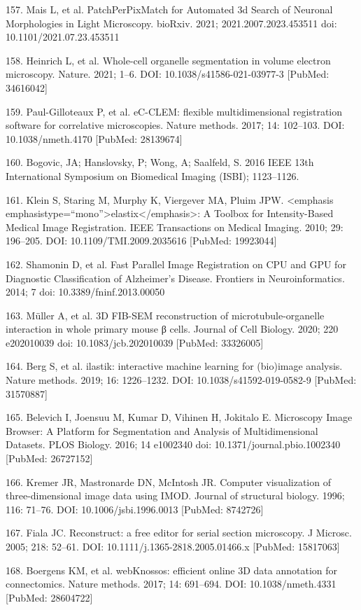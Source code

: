 \documentclass{article}
\begin{document}
\begin{hangpars}
157. Mais L, et al. PatchPerPixMatch for Automated 3d Search of Neuronal Morphologies in Light Microscopy. bioRxiv. 2021; 2021.2007.2023.453511 doi: 10.1101/2021.07.23.453511

158. Heinrich L, et al. Whole-cell organelle segmentation in volume electron microscopy. Nature. 2021; 1–6. DOI: 10.1038/s41586-021-03977-3 [PubMed: 34616042]

159. Paul-Gilloteaux P, et al. eC-CLEM: flexible multidimensional registration software for correlative microscopies. Nature methods. 2017; 14: 102–103. DOI: 10.1038/nmeth.4170 [PubMed: 28139674]

160. Bogovic, JA; Hanslovsky, P; Wong, A; Saalfeld, S. 2016 IEEE 13th International Symposium on Biomedical Imaging (ISBI); 1123–1126.

161. Klein S, Staring M, Murphy K, Viergever MA, Pluim JPW. <emphasis emphasistype=“mono”>elastix</emphasis>: A Toolbox for Intensity-Based Medical Image Registration. IEEE Transactions on Medical Imaging. 2010; 29: 196–205. DOI: 10.1109/TMI.2009.2035616 [PubMed: 19923044]

162. Shamonin D, et al. Fast Parallel Image Registration on CPU and GPU for Diagnostic Classification of Alzheimer’s Disease. Frontiers in Neuroinformatics. 2014; 7 doi: 10.3389/fninf.2013.00050

163. Müller A, et al. 3D FIB-SEM reconstruction of microtubule-organelle interaction in whole primary mouse β cells. Journal of Cell Biology. 2020; 220 e202010039 doi: 10.1083/jcb.202010039 [PubMed: 33326005]

164. Berg S, et al. ilastik: interactive machine learning for (bio)image analysis. Nature methods. 2019; 16: 1226–1232. DOI: 10.1038/s41592-019-0582-9 [PubMed: 31570887]

165. Belevich I, Joensuu M, Kumar D, Vihinen H, Jokitalo E. Microscopy Image Browser: A Platform for Segmentation and Analysis of Multidimensional Datasets. PLOS Biology. 2016; 14 e1002340 doi: 10.1371/journal.pbio.1002340 [PubMed: 26727152]

166. Kremer JR, Mastronarde DN, McIntosh JR. Computer visualization of three-dimensional image data using IMOD. Journal of structural biology. 1996; 116: 71–76. DOI: 10.1006/jsbi.1996.0013 [PubMed: 8742726]

167. Fiala JC. Reconstruct: a free editor for serial section microscopy. J Microsc. 2005; 218: 52–61. DOI: 10.1111/j.1365-2818.2005.01466.x [PubMed: 15817063]

168. Boergens KM, et al. webKnossos: efficient online 3D data annotation for connectomics. Nature methods. 2017; 14: 691–694. DOI: 10.1038/nmeth.4331 [PubMed: 28604722]


\end{hangpars}
\end{document}
